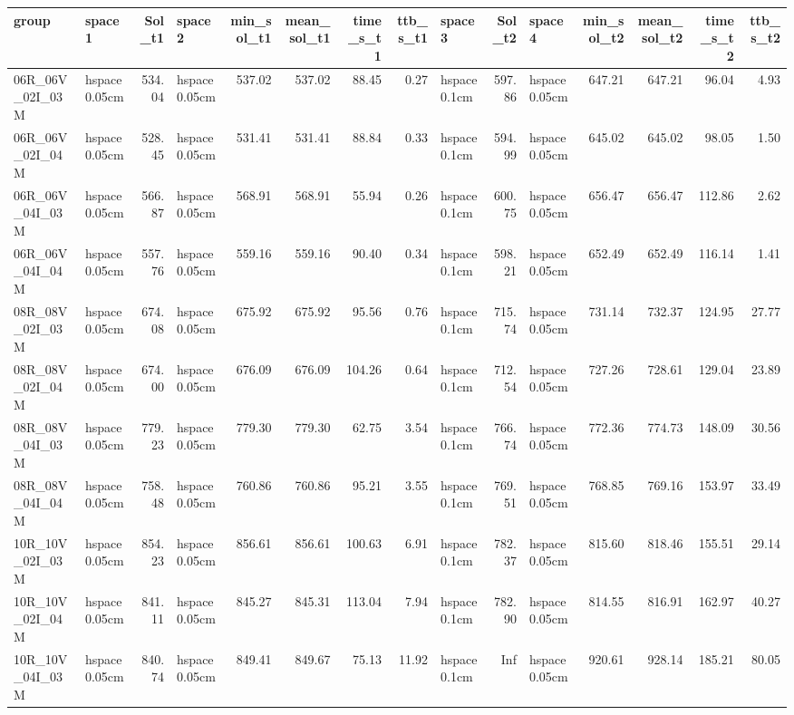 
\begin{tabular}{llrlrrrrlrlrrrr}
\toprule
group & space1 & Sol_t1 & space2 & min_sol_t1 & mean_sol_t1 & time_s_t1 & ttb_s_t1 & space3 & Sol_t2 & space4 & min_sol_t2 & mean_sol_t2 & time_s_t2 & ttb_s_t2\\
\midrule
06R_06V_02I_03M & hspace{0.05cm} & 534.04 & hspace{0.05cm} & 537.02 & 537.02 & 88.45 & 0.27 & hspace{0.1cm} & 597.86 & hspace{0.05cm} & 647.21 & 647.21 & 96.04 & 4.93\\
06R_06V_02I_04M & hspace{0.05cm} & 528.45 & hspace{0.05cm} & 531.41 & 531.41 & 88.84 & 0.33 & hspace{0.1cm} & 594.99 & hspace{0.05cm} & 645.02 & 645.02 & 98.05 & 1.50\\
06R_06V_04I_03M & hspace{0.05cm} & 566.87 & hspace{0.05cm} & 568.91 & 568.91 & 55.94 & 0.26 & hspace{0.1cm} & 600.75 & hspace{0.05cm} & 656.47 & 656.47 & 112.86 & 2.62\\
06R_06V_04I_04M & hspace{0.05cm} & 557.76 & hspace{0.05cm} & 559.16 & 559.16 & 90.40 & 0.34 & hspace{0.1cm} & 598.21 & hspace{0.05cm} & 652.49 & 652.49 & 116.14 & 1.41\\
\addlinespace
08R_08V_02I_03M & hspace{0.05cm} & 674.08 & hspace{0.05cm} & 675.92 & 675.92 & 95.56 & 0.76 & hspace{0.1cm} & 715.74 & hspace{0.05cm} & 731.14 & 732.37 & 124.95 & 27.77\\
08R_08V_02I_04M & hspace{0.05cm} & 674.00 & hspace{0.05cm} & 676.09 & 676.09 & 104.26 & 0.64 & hspace{0.1cm} & 712.54 & hspace{0.05cm} & 727.26 & 728.61 & 129.04 & 23.89\\
08R_08V_04I_03M & hspace{0.05cm} & 779.23 & hspace{0.05cm} & 779.30 & 779.30 & 62.75 & 3.54 & hspace{0.1cm} & 766.74 & hspace{0.05cm} & 772.36 & 774.73 & 148.09 & 30.56\\
08R_08V_04I_04M & hspace{0.05cm} & 758.48 & hspace{0.05cm} & 760.86 & 760.86 & 95.21 & 3.55 & hspace{0.1cm} & 769.51 & hspace{0.05cm} & 768.85 & 769.16 & 153.97 & 33.49\\
\addlinespace
10R_10V_02I_03M & hspace{0.05cm} & 854.23 & hspace{0.05cm} & 856.61 & 856.61 & 100.63 & 6.91 & hspace{0.1cm} & 782.37 & hspace{0.05cm} & 815.60 & 818.46 & 155.51 & 29.14\\
10R_10V_02I_04M & hspace{0.05cm} & 841.11 & hspace{0.05cm} & 845.27 & 845.31 & 113.04 & 7.94 & hspace{0.1cm} & 782.90 & hspace{0.05cm} & 814.55 & 816.91 & 162.97 & 40.27\\
10R_10V_04I_03M & hspace{0.05cm} & 840.74 & hspace{0.05cm} & 849.41 & 849.67 & 75.13 & 11.92 & hspace{0.1cm} & Inf & hspace{0.05cm} & 920.61 & 928.14 & 185.21 & 80.05\\

\end{tabular}
